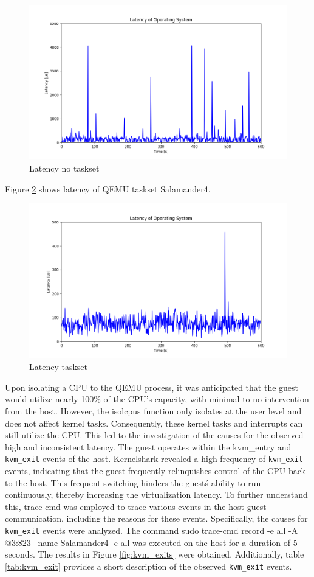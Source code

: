 \documentclass[MMR,Master,english]{twbook}
\begin{document}
 \begin{figure}[H]
     \centering
     \includegraphics[width=0.75\columnwidth]{img/max_latency_default.png}
     \caption[Latency no taskset]{Latency no taskset}
     \label{fig:max_latency_default}
   \end{figure}
 
 
   Figure \ref{fig:max_latency_taskset} shows latency of QEMU taskset Salamander4.
   \begin{figure}[H]
     \centering
     \includegraphics[width=0.75\columnwidth]{img/max_latency_taskset.png}
     \caption[Latency taskset]{Latency taskset}
     \label{fig:max_latency_taskset}
   \end{figure}
 

\noindent Upon isolating a CPU to the QEMU process, it was anticipated that the guest would utilize nearly 100\% of the CPU's capacity, with minimal to no intervention from the host. However, the isolcpus function only isolates at the user level and does not affect kernel tasks. Consequently, these kernel tasks and interrupts can still utilize the CPU. This led to the investigation of the causes for the observed high and inconsistent latency. The guest operates within the kvm\_entry and \texttt{kvm\_exit} events of the host. Kernelshark revealed a high frequency of \texttt{kvm\_exit} events, indicating that the guest frequently relinquishes control of the CPU back to the host. This frequent switching hinders the guest\'s ability to run continuously, thereby increasing the virtualization latency. To further understand this, trace-cmd was employed to trace various events in the host-guest communication, including the reasons for these events. Specifically, the causes for \texttt{kvm\_exit} events were analyzed. The command sudo trace-cmd record -e all -A @3:823 --name Salamander4 -e all was executed on the host for a duration of 5 seconds. The results in Figure \ref{fig:kvm_exits} were obtained. Additionally, table \ref{tab:kvm_exit} provides a short description of the observed \texttt{kvm\_exit} events. 
\end{document}
